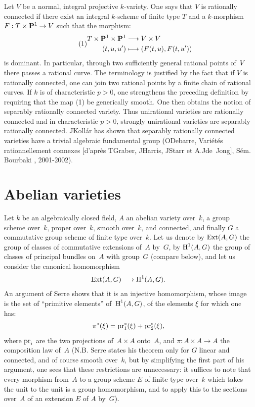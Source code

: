 \begin{remarks}
Let $V$ be a normal, integral projective $k$-variety. One says that $V$ is
rationally connected if there exist an integral $k$-scheme of finite type
$T$ and a $k$-morphism $F : T\times\PP^1\to V$ such that the morphism:
\begin{equation}\tag*{(1)}
\begin{split}
T \times\PP^1\times\PP^1&\to V\times V\\
(t, u, u')&\mto(F(t,u), F(t,u'))
\end{split}
\end{equation}
is dominant. In particular, through two sufficiently general rational
points of~$V$ there passes a rational curve. The terminology is
justified by the fact that if $V$ is rationally connected, one can
join two rational points by a finite chain of rational
curves. If $k$ is of characteristic $p>0$, one strengthens the
preceding definition by requiring that the map (1) be
generically smooth. One then obtains the notion of separably
rationally connected variety. Thus unirational varieties
are rationally connected and in characteristic
$p>0$, strongly unirational varieties are separably
rationally connected. J\ptbl Koll\'ar has shown that separably
rationally connected varieties have a trivial algebraic
fundamental group (\cf O\ptbl Debarre, Vari\'et\'es rationnellement
connexes [d'apr\`es T\ptbl Graber, J\ptbl Harris, J\ptbl Starr et A.J\ptbl de~Jong],
S\'em. Bourbaki , 2001-2002).\rcrochetbf
\end{remarks}

\section{Abelian varieties}
\label{XI.2}
Let $k$ be an algebraically closed field, $A$ an abelian
variety over~$k$, \ie a group scheme over~$k$, proper
over~$k$, smooth over~$k$, and connected, and finally $G$ a
commutative group scheme of finite type over~$k$. Let us denote by $\operatorname{Ext}(A,G)$ the
group of classes of commutative extensions of~$A$ by~$G$, by
$\operatorname{H}^1(A,G)$ the group of classes of principal bundles on~$A$ with
group~$G$ (compare \No {} below), and let us consider
the canonical homomorphism
$$
\Ext(A,G)\to \H^1(A,G)\quoi.
$$
An
argument of Serre \cite[Chap\ptbl VII, Th]{XI.5} shows that it is an
injective homomorphism, whose image is the set of
``primitive elements'' of~$\operatorname{H}^1(A,G)$, \ie of the
elements $\xi$ for which one has:
$$
\pi^*(\xi) = \mathrm{pr}_1^*(\xi) + \mathrm{pr}_2^*(\xi),
$$
where $\mathrm{pr}_i$ are the two projections of~$A\times A$
onto~$A$, and $\pi\colon A\times A\to A$ the composition law of~$A$
(N.B. Serre states his theorem only for $G$
linear and connected, and of course smooth over~$k$, but by
simplifying the first part of his argument, one sees that
these restrictions are unnecessary: it suffices to note that every morphism
from~$A$ to a group scheme $E$ of finite type over~$k$ which
takes the unit to the unit is a group homomorphism, and
to apply this to the sections over~$A$ of an extension $E$ of
$A$ by~$G$).

